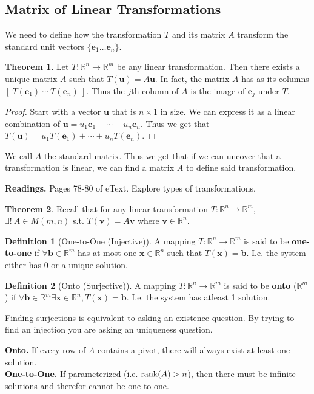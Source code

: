 \documentclass{article}
\numberwithin{equation}{section}
\newenvironment{statement}[1]{\smallskip\noindent\color[rgb]{1.00,0.00,0.50} {\bf #1.}}{}
\theoremstyle{definition}
\newtheorem{thm}{Theorem}[subsection]
\newtheorem{defn}{Definition}[subsection]
\newcommand{\V}{\mathbf{v}}
\newcommand{\U}{\mathbf{u}}
\newcommand{\R}{\mathbb{R}}
\let\oldforall\forall
\let\oldexists\exists
\renewcommand{\forall}{\mathrel{\oldforall}}
\renewcommand{\exists}{\mathrel{\oldexists}}
\newcommand{\x}{\times}
\theoremstyle{adefn}
\begin{document}
	\subsection{Matrix of Linear Transformations}
	We need to define how the transformation $T$ and its matrix $A$ transform the standard unit vectors $\{ \mathbf{e}_1 \ldots \mathbf{e}_n \}$. 
	\begin{thm}
		Let $T: \R^n \to \R^m$ be any linear transformation. Then there exists a unique matrix $A$ such that $T(\U) = A\U$. In fact, the matrix $A$ has as its columns $[\ T(\mathbf{e}_1)\ \cdots\ T(\mathbf{e}_n)\ ]$. Thus the $j$th column of $A$ is the image of $\mathbf{e}_j$ under $T$. 
	\end{thm}
	\begin{proof}
		Start with a vector $\U$ that is $n \x 1$ in size. We can express it as a linear combination of $\U = u_1\mathbf{e}_1 + \cdots + u_n\mathbf{e}_n$. Thus we get that $T(\U) = u_1T(\mathbf{e}_1) + \cdots + u_nT(\mathbf{e}_n)$. 
	\end{proof}
	We call $A$ the standard matrix. Thus we get that if we can uncover that a transformation is linear, we can find a matrix $A$ to define said transformation. 
	\begin{framed}
		\textbf{Readings.} Pages 78-80 of eText. Explore types of transformations.  
	\end{framed}
	\begin{thm}
		Recall that for any linear transformation $T: \R^n \to \R^m$, $\exists!\ A \in M(m, n)$ s.t. $T(\V) = A\V$ where $\V \in \R^n$.
	\end{thm}
	\begin{defn}[One-to-One (Injective)]
		A mapping $T: \R^n \to \R^m$ is said to be \textbf{one-to-one} if $\forall \mathbf{b} \in \R^m$ has at most one $\mathbf{x} \in \R^n$ such that $T(\mathbf{x}) = \mathbf{b}$. I.e. the system either has 0 or a unique solution. 
	\end{defn}
	\begin{defn}[Onto (Surjective)]
		A mapping $T: \R^n \to \R^m$ is said to be \textbf{onto} ($\R^m$) if $\forall \mathbf{b} \in \R^m \exists \mathbf{x} \in \R^n, T(\mathbf{x}) = \mathbf{b}$. I.e. the system has atleast 1 solution. 
	\end{defn}
	Finding surjections is equivalent to asking an existence question. By trying to find an injection you are asking an uniqueness question. 
	\begin{framed}
		\begin{statement}{Onto}
			If every row of $A$ contains a pivot, there will always exist at least one solution. 
		\end{statement}\\
		\begin{statement}{One-to-One}
			If parameterized (i.e. $\hbox{rank}(A) > n$), then there must be infinite solutions and therefor cannot be one-to-one. 
		\end{statement}
	\end{framed}
\end{document}
